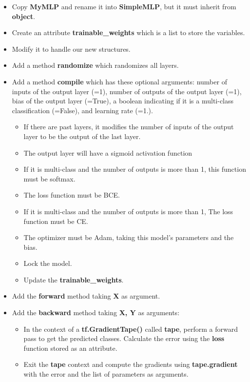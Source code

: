 \documentclass[11pt, a4paper]{article}
\begin{document}
\begin{multicols}{2}
	\begin{itemize}  
		\item Copy \textbf{MyMLP} and rename it into \textbf{SimpleMLP}, but it must inherit from \textbf{object}.
		\item Create an attribute \textbf{trainable\_weights} which is a list to store the variables.
		\item Modify it to handle our new structures.
		\item Add a method \textbf{randomize} which randomizes all layers.
		\item Add a method \textbf{compile} which has these optional arguments: number of inputs of the output layer (=1), number of outputs of the output layer (=1), bias of the output layer (=True), a boolean indicating if it is a multi-class classification (=False), and learning rate (=1.).
		\begin{itemize} 
			\item If there are past layers, it modifies the number of inputs of the output layer to be the output of the last layer.
			\item The output layer will have a sigmoid activation function
			\item If it is multi-class and the number of outputs is more than 1, this function must be softmax.
			\item The loss function must be BCE.
			\item If it is multi-class and the number of outputs is more than 1, The loss function must be CE.
			\item The optimizer must be Adam, taking this model's parameters and the bias.
			\item Lock the model.
			\item Update the \textbf{trainable\_weights}.
		\end{itemize}
		\item Add the \textbf{forward} method taking \textbf{X} as argument.
		\item Add the \textbf{backward} method taking \textbf{X, Y} as arguments:
		\begin{itemize} 
			\item In the context of a \textbf{tf.GradientTape()} called \textbf{tape}, perform a forward pass to get the predicted classes. Calculate the error using the \textbf{loss} function stored as an attribute. 
			\item Exit the \textbf{tape} context and compute the gradients using \textbf{tape.gradient} with the error and the list of parameters as arguments. 

\end{itemize}
\end{itemize}
\end{multicols}
\end{document}
